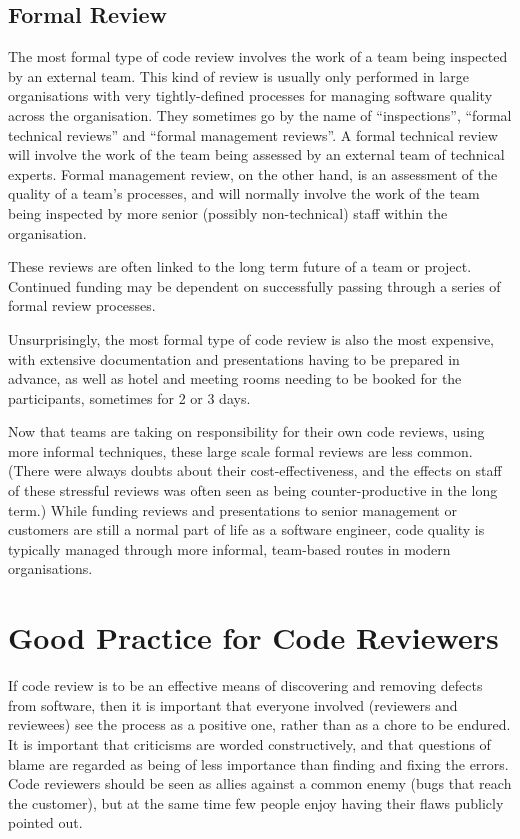 \documentclass[
]{book}
\begin{document}
\hypertarget{formal}{%
\subsection{Formal Review}\label{formal}}

The most formal type of code review involves the work of a team being inspected by an external team. This kind of review is usually only performed in large organisations with very tightly-defined processes for managing software quality across the organisation. They sometimes go by the name of ``inspections'', ``formal technical reviews'' and ``formal management reviews''. A formal technical review will involve the work of the team being assessed by an external team of technical experts. Formal management review, on the other hand, is an assessment of the quality of a team's processes, and will normally involve the work of the team being inspected by more senior (possibly non-technical) staff within the organisation.

These reviews are often linked to the long term future of a team or project. Continued funding may be dependent on successfully passing through a series of formal review processes.

Unsurprisingly, the most formal type of code review is also the most expensive, with extensive documentation and presentations having to be prepared in advance, as well as hotel and meeting rooms needing to be booked for the participants, sometimes for 2 or 3 days.

Now that teams are taking on responsibility for their own code reviews, using more informal techniques, these large scale formal reviews are less common. (There were always doubts about their cost-effectiveness, and the effects on staff of these stressful reviews was often seen as being counter-productive in the long term.) While funding reviews and presentations to senior management or customers are still a normal part of life as a software engineer, code quality is typically managed through more informal, team-based routes in modern organisations.

\hypertarget{goodpractice}{%
\section{Good Practice for Code Reviewers}\label{goodpractice}}

If code review is to be an effective means of discovering and removing defects from software, then it is important that everyone involved (reviewers and reviewees) see the process as a positive one, rather than as a chore to be endured. It is important that criticisms are worded constructively, and that questions of blame are regarded as being of less importance than finding and fixing the errors. Code reviewers should be seen as allies against a common enemy (bugs that reach the customer), but at the same time few people enjoy having their flaws publicly pointed out.
\end{document}
